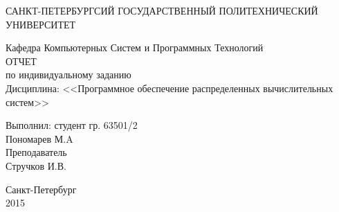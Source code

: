 \begin{center} 

\large САНКТ-ПЕТЕРБУРГСИЙ ГОСУДАРСТВЕННЫЙ ПОЛИТЕХНИЧЕСКИЙ УНИВЕРСИТЕТ

\large Кафедра Компьютерных Систем и Программных Технологий \\[5.5cm] 

\huge ОТЧЕТ \\[0.6cm] %
\large по индивидуальному заданию\\
\large Дисциплина: <<Программное обеспечение распределенных вычислительных систем>>\\[3.7cm]

\end{center} 

\begin{flushright}
Выполнил: студент гр. 63501/2 \\
Пономарев М.A \\[1.2cm]


Преподаватель \\
Стручков И.В.
\end{flushright}


\vfill 

\begin{center} 
\large Санкт-Петербург \\
2015
\end{center} 

\thispagestyle{empty}
